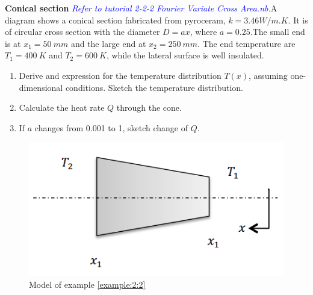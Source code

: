 \begin{example}
\label{example:2:2}
\textbf{Conical section} \textcolor{blue} {\emph{Refer to tutorial 
2-2-2 Fourier Variate Cross Area.nb.}}A diagram shows a conical section 
fabricated from pyroceram, $k=3.46W/m.K$. It is of circular cross section with 
the diameter $D=ax$, where $a=0.25$.The small end is at $x_1=50~mm$ and the large end at $x_2=250~mm$.
The end temperature are $T_1=400~K$ and $T_2=600~K$, while the lateral 
surface is well insulated.
\begin{enumerate}
\item Derive and expression for the temperature distribution $T(x)$,
assuming one-dimensional conditions. Sketch the temperature distribution.
\item Calculate the heat rate $Q$ through the cone.
\item If $a$ changes from 0.001 to 1, sketch change of $Q$.
\end{enumerate}
\begin{figure}[H]
  \centering
    \includegraphics[scale=0.6]{figures/ch2/3}
    \caption{Model of example \ref{example:2:2}}
    \label{fig:2:3}
\end{figure}
\end{example}

